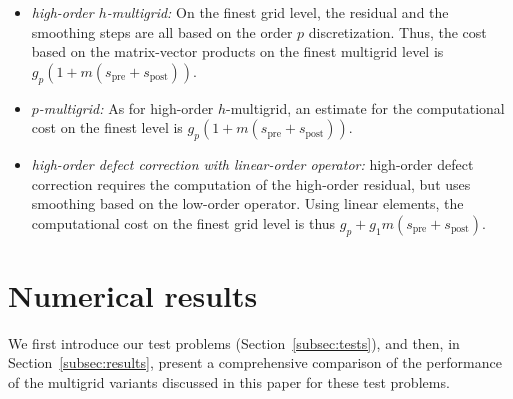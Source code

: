 \documentclass[smallcondensed,final]{svjour3}     %
\begin{document}
\begin{itemize}
\item {\em high-order $h$-multigrid:} On the finest grid level, the
  residual and the smoothing steps are all based on the order $p$
  discretization. Thus, the cost based on the matrix-vector products
  on the finest multigrid level is
  $g_p(1+m(s_\text{pre}+s_\text{post}))$.

\item {\em $p$-multigrid:} As for high-order $h$-multigrid, an
  estimate for the computational cost on the finest level is
  $g_p(1+m(s_\text{pre}+s_\text{post}))$.

\item {\em high-order defect correction with linear-order operator:}
  high-order defect correction requires the computation of the
  high-order residual, but uses smoothing based on the low-order
  operator. Using linear elements, the computational cost on the
  finest grid level is thus
  $g_p+g_1m(s_\text{pre}+s_\text{post})$.
\end{itemize}


\section{Numerical results}\label{sec:numerics}
We first introduce our test problems (Section~\ref{subsec:tests}), and
then, in Section~\ref{subsec:results}, present a comprehensive
comparison of the performance of the multigrid variants discussed
in this paper for these test problems.
\end{document}
